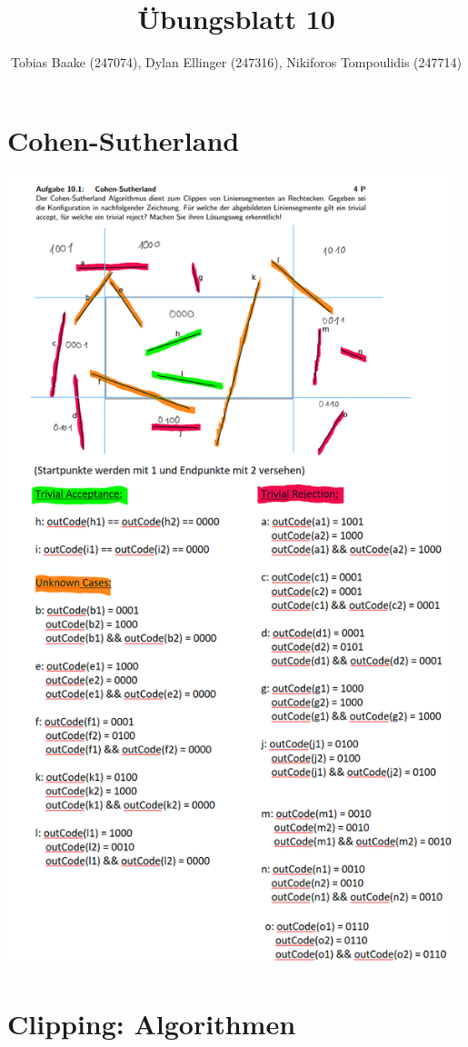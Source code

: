 \documentclass{article}
\title{Übungsblatt 10}
\author{Tobias Baake (247074), Dylan Ellinger (247316), Nikiforos Tompoulidis (247714)}
\begin{document}
\maketitle

\section{Cohen-Sutherland}
\includegraphics[width=370pt]{./files/Übung10.1.png}

\section{Clipping: Algorithmen}
\end{document}
